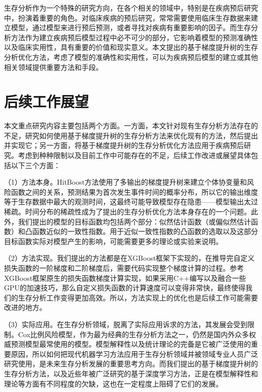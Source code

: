 生存分析作为一个特殊的研究方向，在各个相关的领域中，特别是在疾病预后研究中，扮演着重要的角色。对临床疾病的预后研究，常常需要使用临床生存数据来建立模型，通过模型来进行预后预测，或者寻找对疾病有重要影响的因子。而生存分析方法作为建立疾病预后模型过程中必不可少的部分，它影响着模型的预测准确性以及临床实用性，具有重要的价值和现实意义。本文提出的基于梯度提升树的生存分析优化方法，考虑了模型的准确性和实用性，可以为疾病预后模型的建立或其他相关领域提供重要方法和手段。

\section{后续工作展望}
本文重点研究内容主要包括两个方面。一方面，本文针对现有生存分析方法存在的不足，研究如何使用基于梯度提升树的生存分析方法来优化现有的方法，然后提出并实现它；另一方面，将基于梯度提升树的生存分析优化方法应用于疾病预后研究。考虑到种种限制以及目前工作中可能存在的不足，后续工作改进或展望具体包括以下三个方面：

（1）方法本身。HitBoost方法使用了多输出的梯度提升树来建立个体协变量和风险函数之间的关系，预测结果为首次发生事件时间的概率分布，所以它的输出维度等于生存数据中最大的观测时间，这最终可能导致模型存在隐患——模型输出太过稀疏。时间分布的稀疏性成为了提出的生存分析优化方法本身存在的一个问题。此外，我们提出的模型的目标函数均包括两个部分：似然估计函数（或偏似然估计函数）和凸函数近似的一致性指数。用于近似一致性指数的凸函数的选取以及这部分目标函数实际对模型产生的影响，可能需要更多的理论或实验来说明。

（2）方法实现。我们提出的方法都是在XGBoost框架下实现的，在推导完自定义损失函数的一阶梯度和二阶梯度后，需要代码实现整个梯度计算的过程。参考XGBoost框架原生的损失函数梯度计算实现，如果采用C++编写以及融合一些GPU的加速技巧，那么自定义损失函数的计算速度可以变得非常快，最终使得我们的生存分析工作变得更加高效。所以，方法实现上的优化也是后续工作可能需要改进的地方。
    
（3）实际应用。在生存分析领域，脱离了实际应用诉求的方法，其发展会受到限制。Cox比例风险模型，作为最为经典的生存分析方法之一，仍然是国内外众多权威预测模型最常使用的模型。模型解释性以及统计理论的完备是它被广泛使用的重要原因，所以如何把现代机器学习方法应用于生存分析领域并被领域专业人员广泛研究使用，是未来生存分析发展的重要思考方向。而我们提出的基于梯度提升树的生存分析方法，以及近些年被广泛研究的基于深度学习方法，正是在模型解释性和理论等方面有不同程度的欠缺，这也在一定程度上阻碍了它们的发展。

